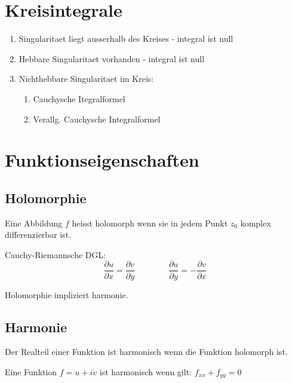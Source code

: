 \documentclass[10pt,a4paper]{article}
\begin{document}
\section{Kreisintegrale}
\begin{enumerate}
 \item Singularitaet liegt ausserhalb des Kreises - integral ist null
 \item Hebbare Singularitaet vorhanden - integral ist null
 \item Nichthebbare Singularitaet im Kreis:
 \begin{enumerate}
  \item Cauchysche Itegralformel
  \item Verallg. Cauchysche Integralformel
 \end{enumerate}
\end{enumerate}

\section{Funktionseigenschaften}
\subsection{Holomorphie}
Eine Abbildung $f$ heisst holomorph wenn sie in jedem Punkt $z_0$ komplex differenzierbar ist.

Cauchy-Riemannsche DGL:
\[
\frac{\partial u}{\partial x} = \frac{\partial v}{\partial y}
\,\,\,\,\,\,\,\,\,\,\,\,\,\,\,\,\,\,\,\,\,\,\,\,
\frac{\partial u}{\partial y} = - \frac{\partial v}{\partial x}
\]

Holomorphie impliziert harmonie.

\subsection{Harmonie}
Der Realteil einer Funktion ist harmonisch wenn die Funktion holomorph ist.

Eine Funktion $f=u + iv$ ist harmonisch wenn gilt: $f_{xx} + f_{yy} = 0$
\end{document}
